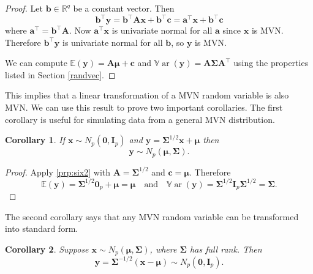 \documentclass[
]{book}
\newtheorem{corollary}{Corollary}[chapter]
\theoremstyle{definition}
\theoremstyle{definition}
\theoremstyle{definition}
\theoremstyle{definition}
\theoremstyle{remark}
\begin{document}
\begin{proof}
Let \(\mathbf b\in \mathbb{R}^q\) be a constant vector. Then
\[ \mathbf b^\top \mathbf y= \mathbf b^\top \mathbf A\mathbf x+ \mathbf b^\top \mathbf c= \mathbf a^\top \mathbf x+ \mathbf b^\top \mathbf c\]
where \(\mathbf a^\top = \mathbf b^\top \mathbf A\). Now \(\mathbf a^\top \mathbf x\) is univariate normal for all \(\mathbf a\) since \(\mathbf x\) is MVN. Therefore \(\mathbf b^\top \mathbf y\) is univariate normal for all \(\mathbf b\), so \(\mathbf y\) is MVN.

We can compute \({\mathbb{E}}(\mathbf y)=\mathbf A{\boldsymbol{\mu}}+\mathbf c\) and \({\mathbb{V}\operatorname{ar}}(\mathbf y)=\mathbf A\boldsymbol{\Sigma}\mathbf A^\top\) using the properties listed in Section \ref{randvec}.
\end{proof}

This implies that a linear transformation of a MVN random variable is also MVN. We can use this result to prove two important corollaries. The first corollary is useful for simulating data from a general MVN distribution.

\begin{corollary}
\protect\hypertarget{cor:csix2}{}\label{cor:csix2}If \(\mathbf x\sim N_p({\boldsymbol 0},\mathbf I_p)\) and \(\mathbf y= \boldsymbol{\Sigma}^{1/2} \mathbf x+ {\boldsymbol{\mu}}\) then \[\mathbf y\sim N_p({\boldsymbol{\mu}},\boldsymbol{\Sigma}).\]
\end{corollary}

\begin{proof}
Apply \ref{prp:six2} with \(\mathbf A= \boldsymbol{\Sigma}^{1/2}\) and \(\mathbf c= {\boldsymbol{\mu}}\). Therefore
\[{\mathbb{E}}(\mathbf y) = \boldsymbol{\Sigma}^{1/2} {\boldsymbol 0}_p + {\boldsymbol{\mu}}= {\boldsymbol{\mu}}\quad \mbox{and}\quad {\mathbb{V}\operatorname{ar}}(\mathbf y) = \boldsymbol{\Sigma}^{1/2} \mathbf I_p \boldsymbol{\Sigma}^{1/2} = \boldsymbol{\Sigma}.\]
\end{proof}

The second corollary says that any MVN random variable can be transformed into standard form.

\begin{corollary}
\protect\hypertarget{cor:csix3}{}\label{cor:csix3}Suppose \(\mathbf x\sim N_p({\boldsymbol{\mu}},\boldsymbol{\Sigma})\), where \(\boldsymbol{\Sigma}\) has full rank. Then\\
\[\mathbf y= \boldsymbol{\Sigma}^{-1/2}(\mathbf x- {\boldsymbol{\mu}}) \sim N_p({\boldsymbol 0},\mathbf I_p).\]
\end{corollary}
\end{document}

